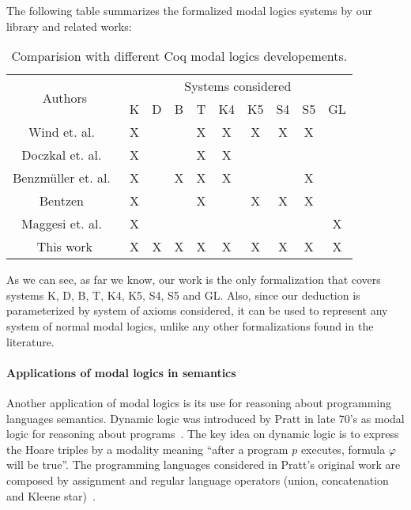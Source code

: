\documentclass[sigconf]{acmart}
\begin{document}
The following table summarizes the formalized modal logics systems by our library
and related works:
\vspace{0.5cm} {
  \begin{table}[H]
    \begin{tabular}{|c|c|c|c|c|c|c|c|c|c|}
      \hline
      \multirow{2}{*}{Authors} & \multicolumn{9}{c|}{Systems considered} \\ \cline{2-10} 
                               & K & D & B & T & K4 & K5 & S4 & S5 & GL\\ \hline
      Wind et. al.~\cite{dewind}     & X &   &   & X & X  & X  & X  &  X & \\ \hline
      Doczkal et. al.~\cite{saarland}   & X &   &   & X & X  &    &    &  &  \\ \hline
      Benzmüller et. al.~\cite{Chris_Bruno}& X &   & X & X &  X &    &    & X &  \\ \hline
      Bentzen~\cite{Bentzen2021} & X & & & X & & X & X & X & \\ \hline
      Maggesi et. al.~\cite{Maggesi21} & X & & & & & & & & X \\ \hline
      This work         & X & X & X & X & X  &  X &  X & X  & X \\ \hline
    \end{tabular}
    \centering
    \caption{Comparision with different Coq modal logics developements.}
    \label{tab:comparacao_trabalhos_rel}
  \end{table}
}

As we can see, as far we know, our work is the only formalization that covers systems
K, D, B, T, K4, K5, S4, S5 and GL. Also, since our deduction is
parameterized by system of axioms considered, it can be used to represent any
system of normal modal logics, unlike any other formalizations found in the literature.

\paragraph{Applications of modal logics in semantics} Another application of
modal logics is its use for reasoning about programming languages semantics.
Dynamic logic was introduced by Pratt in late 70's as modal logic for reasoning
about programs~\cite{Pratt76,Pratt80}. The key idea on dynamic logic is to express the
Hoare triples by a modality meaning ``after a program $p$ executes, formula
$\varphi$ will be true''. The programming languages considered in Pratt's
original work are composed by assignment and regular language operators
(union, concatenation and Kleene star)~\cite{Pratt76}.
\end{document}
